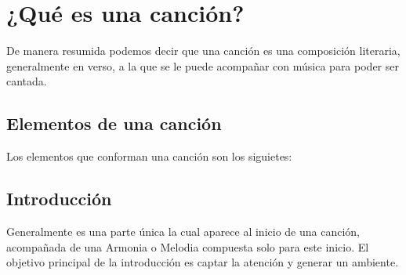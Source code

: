 \documentclass[12pt, a4paper, titlepage]{report}
\begin{document}
		  
	    \section{¿Qué es una canción?}
	    De manera resumida podemos decir que una canción es una composición literaria, generalmente en verso, a la que se le puede acompañar con música para poder ser cantada.\cite{refEstructuraCancion1}\par
			\subsection{Elementos de una canción}
			Los elementos que conforman una canción son los siguietes:
			\subsection{Introducción}
			Generalmente es una parte única la cual aparece al inicio de una canción, acompañada de una \Gls{Armonia} o \Gls{Melodia} compuesta solo para este inicio. El objetivo principal de la introducción es captar la atención y generar un ambiente.\cite{refEstructuraCancion2}\par
\end{document}
